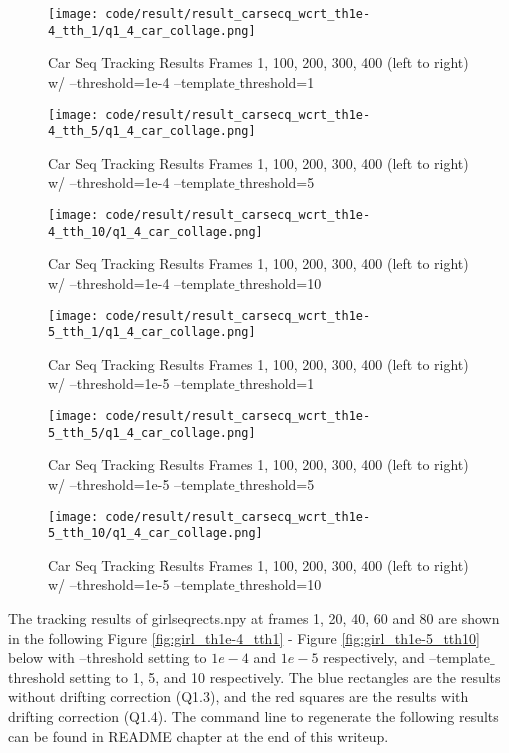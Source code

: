 \documentclass{article}
\begin{document}
	\begin{figure}[H]		
	\centering
	\texttt{[image: code/result/result\_carsecq\_wcrt\_th1e-4\_tth\_1/q1\_4\_car\_collage.png]}  %
	\caption{Car Seq Tracking Results Frames 1, 100, 200, 300, 400 (left to right) w/ --threshold=1e-4 --template$\_$threshold=1}
	\label{fig:car_th1e-4_tth1}
	\end{figure}
	\begin{figure}[H]		
	\centering
	\texttt{[image: code/result/result\_carsecq\_wcrt\_th1e-4\_tth\_5/q1\_4\_car\_collage.png]}  %
	\caption{Car Seq Tracking Results Frames 1, 100, 200, 300, 400 (left to right) w/ --threshold=1e-4 --template$\_$threshold=5}
	\label{fig:car_th1e-4_tth5}
	\end{figure}
	\begin{figure}[H]		
	\centering
	\texttt{[image: code/result/result\_carsecq\_wcrt\_th1e-4\_tth\_10/q1\_4\_car\_collage.png]}  %
	\caption{Car Seq Tracking Results Frames 1, 100, 200, 300, 400 (left to right) w/ --threshold=1e-4 --template$\_$threshold=10}
	\label{fig:car_th1e-4_tth10}
	\end{figure}
	\begin{figure}[H]		
	\centering
	\texttt{[image: code/result/result\_carsecq\_wcrt\_th1e-5\_tth\_1/q1\_4\_car\_collage.png]}  %
	\caption{Car Seq Tracking Results Frames 1, 100, 200, 300, 400 (left to right) w/ --threshold=1e-5 --template$\_$threshold=1}
	\label{fig:car_th1e-5_tth1}
	\end{figure}
	\begin{figure}[H]		
	\centering
	\texttt{[image: code/result/result\_carsecq\_wcrt\_th1e-5\_tth\_5/q1\_4\_car\_collage.png]}  %
	\caption{Car Seq Tracking Results Frames 1, 100, 200, 300, 400 (left to right) w/ --threshold=1e-5 --template$\_$threshold=5}
	\label{fig:car_th1e-5_tth5}
	\end{figure}
	\begin{figure}[H]		
	\centering
	\texttt{[image: code/result/result\_carsecq\_wcrt\_th1e-5\_tth\_10/q1\_4\_car\_collage.png]}  %
	\caption{Car Seq Tracking Results Frames 1, 100, 200, 300, 400 (left to right) w/ --threshold=1e-5 --template$\_$threshold=10}
	\label{fig:car_th1e-5_tth10}
	\end{figure}
	
	The tracking results of girlseqrects.npy at frames 1, 20, 40, 60 and 80 are shown in the following Figure \ref{fig:girl_th1e-4_tth1} - Figure \ref{fig:girl_th1e-5_tth10} below with --threshold setting to $1e-4$ and $1e-5$ respectively, and --template$\_$threshold setting to 1, 5, and 10 respectively. The blue rectangles are the results without drifting correction (Q1.3), and the red squares are the results with drifting correction (Q1.4). The command line to regenerate the following results can be found in README chapter at the end of this writeup.
\end{document}
